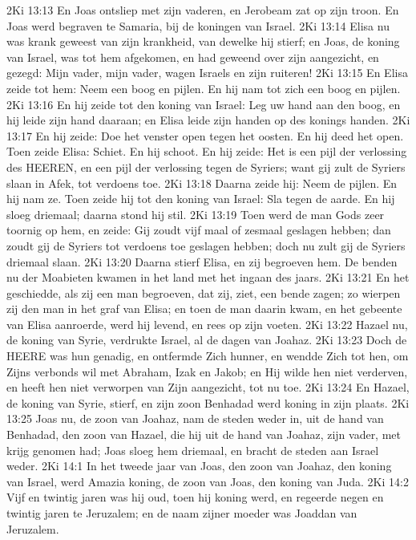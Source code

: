 2Ki 13:13  En Joas ontsliep met zijn vaderen, en Jerobeam zat op zijn troon. En Joas werd begraven te Samaria, bij de koningen van Israel.
2Ki 13:14  Elisa nu was krank geweest van zijn krankheid, van dewelke hij stierf; en Joas, de koning van Israel, was tot hem afgekomen, en had geweend over zijn aangezicht, en gezegd: Mijn vader, mijn vader, wagen Israels en zijn ruiteren!
2Ki 13:15  En Elisa zeide tot hem: Neem een boog en pijlen. En hij nam tot zich een boog en pijlen.
2Ki 13:16  En hij zeide tot den koning van Israel: Leg uw hand aan den boog, en hij leide zijn hand daaraan; en Elisa leide zijn handen op des konings handen.
2Ki 13:17  En hij zeide: Doe het venster open tegen het oosten. En hij deed het open. Toen zeide Elisa: Schiet. En hij schoot. En hij zeide: Het is een pijl der verlossing des HEEREN, en een pijl der verlossing tegen de Syriers; want gij zult de Syriers slaan in Afek, tot verdoens toe.
2Ki 13:18  Daarna zeide hij: Neem de pijlen. En hij nam ze. Toen zeide hij tot den koning van Israel: Sla tegen de aarde. En hij sloeg driemaal; daarna stond hij stil.
2Ki 13:19  Toen werd de man Gods zeer toornig op hem, en zeide: Gij zoudt vijf maal of zesmaal geslagen hebben; dan zoudt gij de Syriers tot verdoens toe geslagen hebben; doch nu zult gij de Syriers driemaal slaan.
2Ki 13:20  Daarna stierf Elisa, en zij begroeven hem. De benden nu der Moabieten kwamen in het land met het ingaan des jaars.
2Ki 13:21  En het geschiedde, als zij een man begroeven, dat zij, ziet, een bende zagen; zo wierpen zij den man in het graf van Elisa; en toen de man daarin kwam, en het gebeente van Elisa aanroerde, werd hij levend, en rees op zijn voeten.
2Ki 13:22  Hazael nu, de koning van Syrie, verdrukte Israel, al de dagen van Joahaz.
2Ki 13:23  Doch de HEERE was hun genadig, en ontfermde Zich hunner, en wendde Zich tot hen, om Zijns verbonds wil met Abraham, Izak en Jakob; en Hij wilde hen niet verderven, en heeft hen niet verworpen van Zijn aangezicht, tot nu toe.
2Ki 13:24  En Hazael, de koning van Syrie, stierf, en zijn zoon Benhadad werd koning in zijn plaats.
2Ki 13:25  Joas nu, de zoon van Joahaz, nam de steden weder in, uit de hand van Benhadad, den zoon van Hazael, die hij uit de hand van Joahaz, zijn vader, met krijg genomen had; Joas sloeg hem driemaal, en bracht de steden aan Israel weder.
2Ki 14:1  In het tweede jaar van Joas, den zoon van Joahaz, den koning van Israel, werd Amazia koning, de zoon van Joas, den koning van Juda.
2Ki 14:2  Vijf en twintig jaren was hij oud, toen hij koning werd, en regeerde negen en twintig jaren te Jeruzalem; en de naam zijner moeder was Joaddan van Jeruzalem.
